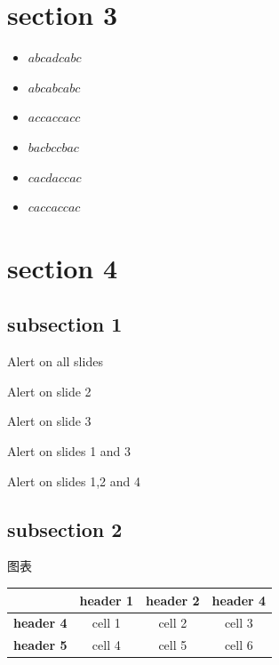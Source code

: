 \documentclass{beamer}
\begin{document}
\section{section 3}
\begin{frame}
	\begin{itemize}
\item<1> $abcadcabc$
\item<1-2> $abcabcabc$
\item<1-2> $accaccacc$
\item<1> $bacbccbac$
\item<1,3> $cacdaccac$
\item<1-2> $caccaccac$
	\end{itemize}
\end{frame}
\section{section 4}
\subsection{subsection 1}
\begin{frame}

\alert{Alert on all slides}

\alert<2>{Alert on slide 2}

\alert<3>{Alert on slide 3}

\alert<1,3>{Alert on slides 1 and 3}

\alert<-2,4>{Alert on slides 1,2 and 4}

\end{frame}
\subsection{subsection 2}
\begin{frame}
\begin{block}{图表}
	\begin{tabular}{|c|c|c|c|}
	\hline
	& \textbf{header 1} &
	\textbf{header 2} & \textbf{header 4} \\
	\hline
	\textbf{header 4} &cell 1 & cell 2 & cell 3 \\
	\hline
	\textbf{header 5} & cell 4 & cell 5 & cell 6 \\
	\hline
\end{tabular}
\newline\newline
\begin{center}
\end{center}
\end{block}
\end{frame}
\end{document}

